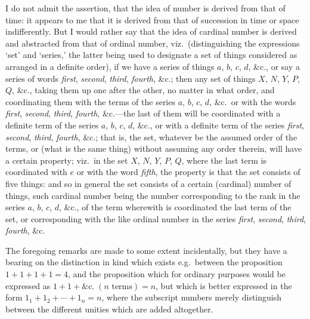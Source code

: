 \documentclass[11pt,a4paper]{article}
\begin{document}
\medskip

I do not admit the assertion, that the idea of number is derived from that of time: it appears to me that it is derived from that of succession in time or space indifferently. But I would rather say that the idea of cardinal number is derived and abstracted from that of ordinal number, viz.\ (distinguishing the expressions `set' and `series,' the latter being used to designate a set of things considered as arranged in a definite order), if we have a series of things $a$, $b$, $c$, $d$, \&c., or say a series of words \emph{first}, \emph{second}, \emph{third}, \emph{fourth}, \&c.; then any set of things $X$, $N$, $Y$, $P$, $Q$, \&c., taking them up one after the other, no matter in what order, and coordinating them with the terms of the series $a$, $b$, $c$, $d$, \&c.\ or with the words \emph{first}, \emph{second}, \emph{third}, \emph{fourth}, \&c.---the last of them will be coordinated with a definite term of the series $a$, $b$, $c$, $d$, \&c., or with a definite term of the series \emph{first}, \emph{second}, \emph{third}, \emph{fourth}, \&c.; that is, the set, whatever be the assumed order of the terms, or (what is the same thing) without assuming any order therein, will have a certain property; viz.\ in the set $X$, $N$, $Y$, $P$, $Q$, where the last term is coordinated with $e$ or with the word \emph{fifth}, the property is that the set consists of five things: and so in general the set consists of a certain (cardinal) number of things, such cardinal number being the number corresponding to the rank in the series $a$, $b$, $c$, $d$, \&c., of the term wherewith is coordinated the last term of the set, or corresponding with the like ordinal number in the series \emph{first}, \emph{second}, \emph{third}, \emph{fourth}, \&c.

\medskip

The foregoing remarks are made to some extent incidentally, but they have a bearing on the distinction in kind which exists e.g.\ between the proposition $1 + 1 + 1 + 1 = 4$, and the proposition which for ordinary purposes would be expressed as $1 + 1 + \mathrm{\&c.}\;(n \text{ terms}) = n$, but which is better expressed in the form $1_1 + 1_2 + \cdots + 1_n = n$, where the subscript numbers merely distinguish between the different unities which are added altogether.

\medskip
\end{document}
